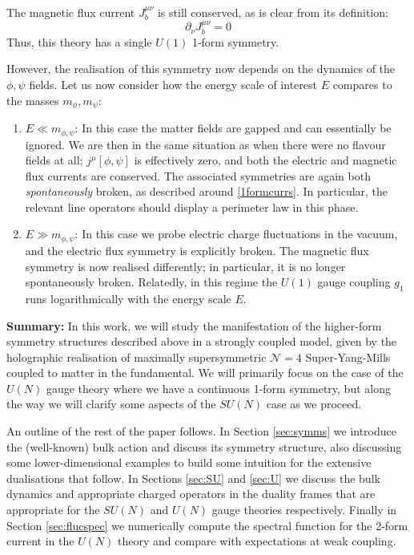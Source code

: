 \documentclass[aps,preprint,nofootinbib,preprintnumbers,eqsecnum,superscriptaddress]{revtex4}
\newcommand\p{\ensuremath{\partial}}
\newcommand{\ben}{\begin{enumerate}}
\newcommand{\een}{\end{enumerate}}
\newcommand\sN{{\ensuremath{{\mathcal N}}}}
\begin{document}
The magnetic flux current $J^{\mu\nu}_b$ is still conserved, as is clear from its definition:
\begin{equation}
\p_{\nu} J^{\mu\nu}_b = 0
\end{equation}
Thus, this theory has a single $U(1)$ 1-form symmetry. 

However, the realisation of this symmetry now depends on the dynamics of the $\phi, \psi$ fields. Let us now consider how the energy scale of interest $E$ compares to the masses $m_{\phi}, m_{\psi}$:
\ben \item $E \ll m_{\phi, \psi}$: In this case the matter fields are gapped and can essentially be ignored. We are then in the same situation as when there were no flavour fields at all; $j^{\mu}[\phi, \psi]$ is effectively zero, and both the electric and magnetic flux currents are conserved. The associated symmetries are again both {\it spontaneously} broken, as described around \eqref{1formcurrs}. In particular, the relevant line operators should display a perimeter law in this phase. 

\item $E \gg m_{\phi, \psi}$: In this case we probe electric charge fluctuations in the vacuum, and the electric flux symmetry is explicitly broken. The magnetic flux symmetry is now realised differently; in particular, it is no longer spontaneously broken. Relatedly, in this regime the $U(1)$ gauge coupling $g_1$ runs logarithmically with the energy scale $E$. 
\een

{\bf Summary:} In this work, we will study the manifestation of the higher-form symmetry structures described above in a strongly coupled model, given by the holographic realisation of maximally supersymmetric $\sN = 4$ Super-Yang-Mills coupled to matter in the fundamental. We will primarily focus on the case of the $U(N)$ gauge theory where we have a continuous 1-form symmetry, but along the way we will clarify some aspects of the $SU(N)$ case as we proceed. 

 An outline of the rest of the paper follows. In Section \ref{sec:symms} we introduce the (well-known) bulk action and discuss its symmetry structure, also discussing some lower-dimensional examples to build some intuition for the extensive dualisations that follow. In Sections \ref{sec:SU} and \ref{sec:U} we discuss the bulk dynamics and appropriate charged operators in the duality frames that are appropriate for the $SU(N)$ and $U(N)$ gauge theories respectively. Finally in Section \ref{sec:flucspec} we numerically compute the spectral function for the 2-form current in the $U(N)$ theory and compare with expectations at weak coupling. 
\end{document}
